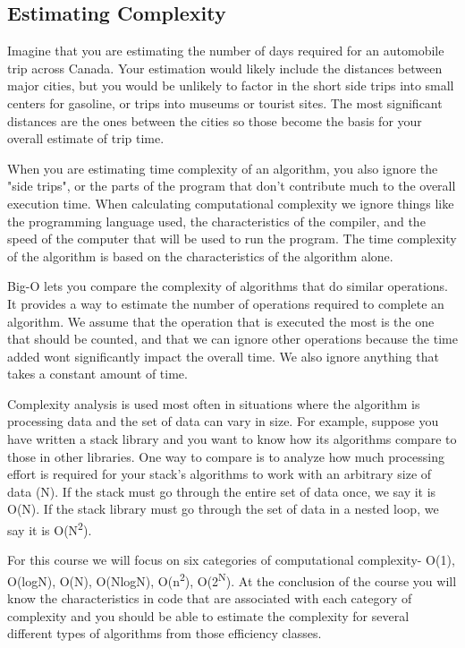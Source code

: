 \subsection{Estimating Complexity}

Imagine that you are estimating the number of days required for an
automobile trip across Canada. Your estimation would likely include the
distances between major cities, but you would be unlikely to factor in
the short side trips into small centers for gasoline, or trips into
museums or tourist sites. The most significant distances are the ones
between the cities so those become the basis for your overall estimate
of trip time.

When you are estimating time complexity of an algorithm, you also ignore the
"side trips", or the parts of the program that don't contribute much to the overall execution time.
When calculating computational complexity we ignore things like the programming language used, the characteristics of the compiler, and the
speed of the computer that will be used to run the program. The time
complexity of the algorithm is based on the characteristics of the
algorithm alone.

Big-O lets you compare the complexity of algorithms that do similar
operations. It provides a way to estimate the number of operations
required to complete an algorithm. We assume that the operation that
is executed the most is the one that should be counted, and that we can
ignore other operations because the time added wont significantly impact
the overall time. We also ignore anything that takes a constant amount
of time.


Complexity analysis is used most often in situations where the algorithm
is processing data and the set of data can vary in size.  For example,
suppose you have written a stack library and you want to know how its algorithms
compare to those in other libraries.  One way to compare is to analyze how much
processing effort is required for your stack's algorithms to work with an
arbitrary size of data (N). If the stack must go through the entire set
of data once, we say it is O(N).  If the stack library must go through
the set of data in a nested loop, we say it is O(N\textsuperscript{2}).

For this course we will focus on six categories of computational
complexity- O(1), O(logN), O(N), O(NlogN), O(n\textsuperscript{2}), O(2\textsuperscript{N}).  At the
conclusion of the course you will know the characteristics in code that
are associated with each category of complexity and you should be able
to estimate the complexity for several different types of  algorithms from those efficiency classes.


